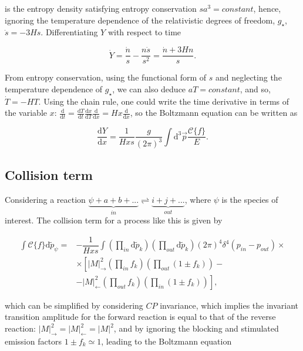\documentclass[final,5p,times,twocolumn, nopreprintline]{elsarticle}
\numberwithin{equation}{section}
\begin{document}
is the entropy density \cite{baumann2022cosmology} satisfying entropy conservation $sa^3=constant$, hence, ignoring the temperature dependence of the relativistic degrees of freedom, $g_\star$, $\dot{s}=-3Hs$. Differentiating $Y$ with respect to time

\begin{equation}
\dot{Y}=\dfrac{\dot{n}}{s}-\dfrac{n\dot{s}}{s^2}=\dfrac{\dot{n}+3Hn}{s}. \label{eq:Ydot}
\end{equation}

From entropy conservation, using the functional form of $s$ and neglecting the temperature dependence of $g_\star$, we can also deduce $aT=constant$, and so, $\dot{T}=-HT$. Using the chain rule, one could write the time derivative in terms of the variable $x$: $\frac{\mathrm{d}}{\mathrm{d}t}=\frac{\mathrm{d}T}{\mathrm{d}t}\frac{\mathrm{d}x}{\mathrm{d}T}\frac{\mathrm{d}}{\mathrm{d}x}=Hx\frac{\mathrm{d}}{\mathrm{d}x}$, so the Boltzmann equation can be written as \cite{mambrini2021particles}

\begin{equation}
\dfrac{\mathrm{d}Y}{\mathrm{d}x}=\dfrac{1}{Hxs}\dfrac{g}{(2\pi)^3}\int\mathrm{d}^3\vec{p}\dfrac{\mathcal{C}\{f\}}{E}. \label{eq:Boltz_Y}
\end{equation}

\subsection{Collision term}

Considering a reaction $\underbrace{\psi+a+b+...}_{in}\rightleftharpoons \underbrace{i+j+...}_{out}$, where $\psi$ is the species of interest. The collision term for a process like this is given by

\begin{align}
\int\mathcal{C}\{f\}\mathrm{d}\tilde{p}_\psi=&-\dfrac{1}{Hxs}\int\left(\prod_{in}\mathrm{d}\tilde{p}_k\right)\left(\prod_{out}\mathrm{d}\tilde{p}_k\right)(2\pi)^4\delta^4(p_{in}-p_{out})\times\nonumber\\
&\times\left[|M|^2_\rightarrow\left(\prod_{in}f_k\right)\left(\prod_{out}(1\pm f_k)\right)\right.-\nonumber\\
&-\left.|M|^2_\leftarrow\left(\prod_{out}f_k\right)\left(\prod_{in}(1\pm f_k)\right)\right], \label{eq:collision_gen}
\end{align}

which can be simplified by considering $CP$ invariance, which implies the invariant transition amplitude for the forward reaction is equal to that of the reverse reaction: $|M|^2_\rightarrow=|M|^2_\leftarrow=|M|^2$, and by ignoring the blocking and stimulated emission factors $1\pm f_k\simeq 1$, leading to the Boltzmann equation \cite{kolb1991early}
\end{document}
